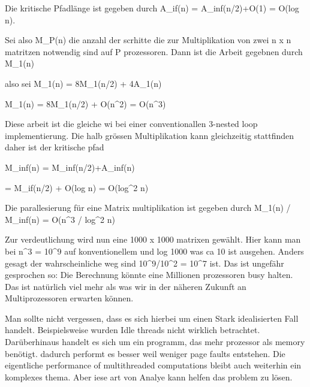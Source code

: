 Die kritische Pfadlänge ist gegeben durch A_if(n) = A_inf(n/2)+O(1) = O(log n).


Sei also M_P(n) die anzahl der scrhitte die zur Multiplikation von zwei n x n matritzen notwendig sind auf P prozessoren. Dann ist die Arbeit gegebnen durch M_1(n) 

also sei
M_1(n) = 8M_1(n/2) + 4A_1(n)

M_1(n) = 8M_1(n/2) + O(n^2)
= O(n^3)


Diese arbeit ist die gleiche wi bei einer conventionallen 3-nested loop implementierung. Die halb grössen Multiplikation kann gleichzeitig stattfinden daher ist der kritische pfad

M_inf(n) = M_inf(n/2)+A_inf(n)

= M_if(n/2) + O(log n)
= O(log^2 n)

Die parallesierung für eine Matrix multiplikation ist gegeben durch M_1(n) / M_inf(n) = O(n^3 / log^2 n)


Zur verdeutlichung wird nun eine 1000 x 1000 matrixen gewählt. Hier kann man bei n^3 = 10^9 auf konventionellem und log 1000 was ca 10 ist ausgehen. Anders gesagt der wahrscheinliche weg sind 10^9/10^2 = 10^7 ist. Das ist ungefähr gesprochen so: Die Berechnung könnte eine Millionen prozessoren busy halten. Das ist natürlich viel mehr als was wir in der näheren Zukunft an Multiprozessoren erwarten können. 


Man sollte nicht vergessen, dass es sich hierbei um einen Stark idealisierten Fall handelt. Beispielsweise wurden Idle threads nicht wirklich betrachtet. Darüberhinaus handelt es sich um ein programm, das mehr prozessor als memory benötigt. dadurch performt es besser weil weniger page faults entstehen. Die eigentliche performance of multithreaded computations bleibt auch weiterhin ein komplexes thema. Aber iese art von Analye kann helfen das problem zu lösen.